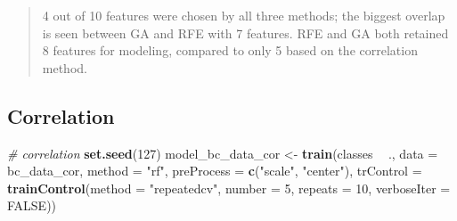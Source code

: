 \documentclass[]{book}
\newenvironment{Shaded}{\begin{snugshade}}{\end{snugshade}}
\newcommand{\CommentTok}[1]{\textcolor[rgb]{0.56,0.35,0.01}{\textit{#1}}}
\newcommand{\DataTypeTok}[1]{\textcolor[rgb]{0.13,0.29,0.53}{#1}}
\newcommand{\DecValTok}[1]{\textcolor[rgb]{0.00,0.00,0.81}{#1}}
\newcommand{\KeywordTok}[1]{\textcolor[rgb]{0.13,0.29,0.53}{\textbf{#1}}}
\newcommand{\NormalTok}[1]{#1}
\newcommand{\OperatorTok}[1]{\textcolor[rgb]{0.81,0.36,0.00}{\textbf{#1}}}
\newcommand{\OtherTok}[1]{\textcolor[rgb]{0.56,0.35,0.01}{#1}}
\newcommand{\StringTok}[1]{\textcolor[rgb]{0.31,0.60,0.02}{#1}}
\begin{document}
\begin{quote}
4 out of 10 features were chosen by all three methods; the biggest overlap is seen between GA and RFE with 7 features. RFE and GA both retained 8 features for modeling, compared to only 5 based on the correlation method.
\end{quote}

\hypertarget{correlation-2}{%
\subsection{Correlation}\label{correlation-2}}

\begin{Shaded}
\begin{Highlighting}[]
\CommentTok{# correlation}
\KeywordTok{set.seed}\NormalTok{(}\DecValTok{127}\NormalTok{)}
\NormalTok{model_bc_data_cor <-}\StringTok{ }\KeywordTok{train}\NormalTok{(classes }\OperatorTok{~}\StringTok{ }\NormalTok{.,}
                 \DataTypeTok{data =}\NormalTok{ bc_data_cor,}
                 \DataTypeTok{method =} \StringTok{"rf"}\NormalTok{,}
                 \DataTypeTok{preProcess =} \KeywordTok{c}\NormalTok{(}\StringTok{"scale"}\NormalTok{, }\StringTok{"center"}\NormalTok{),}
                 \DataTypeTok{trControl =} \KeywordTok{trainControl}\NormalTok{(}\DataTypeTok{method =} \StringTok{"repeatedcv"}\NormalTok{, }\DataTypeTok{number =} \DecValTok{5}\NormalTok{, }\DataTypeTok{repeats =} \DecValTok{10}\NormalTok{, }\DataTypeTok{verboseIter =} \OtherTok{FALSE}\NormalTok{))}
\end{Highlighting}
\end{Shaded}
\end{document}
